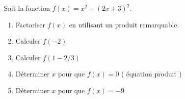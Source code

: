 
\begin{exercice}\label{exoSeconde-0052}

    Soit la fonction \( f(x)=x^2-(2x+3)^2\).
    \begin{enumerate}
 \item
 Factoriser $f(x)$ en utilisant un produit remarquable.
\item
 Calculer $f(-2)$ 
 \item
 Calculer $f(1-2/3)$
 \item
 Déterminer $x$ pour que $f(x)=0$ ( équation produit ) 
 \item
 Déterminer $x$ pour que $f(x)=-9$
            
    \end{enumerate}

\end{exercice}
